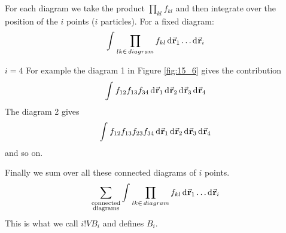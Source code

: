 \documentclass[../main/main.tex]{subfiles}
\begin{document}
For each diagram we take the product \( \prod_{kl}^{} f_{kl}   \) and then integrate over the position of the \( i \) points (\( i \) particles). For a fixed diagram:
\begin{equation}
  \int_{}^{} \prod_{lk \in \, diagram }^{} f_{kl} \dd[]{\va{r}_1} \dots \dd[]{\va{r}_i}
\end{equation}
\begin{example}{\( i=4 \)}{}
  For example the diagram 1 in Figure \ref{fig:15_6} gives the contribution
  \begin{equation}
    \int_{}^{} f_{12} f_{13} f_{34} \dd[]{\va{r}_1}  \dd[]{\va{r}_2} \dd[]{\va{r}_3} \dd[]{\va{r}_4}
  \end{equation}
  The diagram 2 gives
  \begin{equation}
    \int_{}^{} f_{12} f_{13} f_{23} f_{34} \dd[]{\va{r}_1}  \dd[]{\va{r}_2} \dd[]{\va{r}_3} \dd[]{\va{r}_4}
  \end{equation}
  and so on.
\end{example}
Finally we sum over all these connected diagrams of \( i \) points.
\begin{equation}
  \sum_{\substack{ \text{connected} \\  \text{diagrams} } }^{}    \int_{}^{} \prod_{lk \in \, diagram }^{} f_{kl} \dd[]{\va{r}_1} \dots \dd[]{\va{r}_i}
\end{equation}
This is what we call \( i! V B_i \) and defines \( B_i \).
\end{document}
